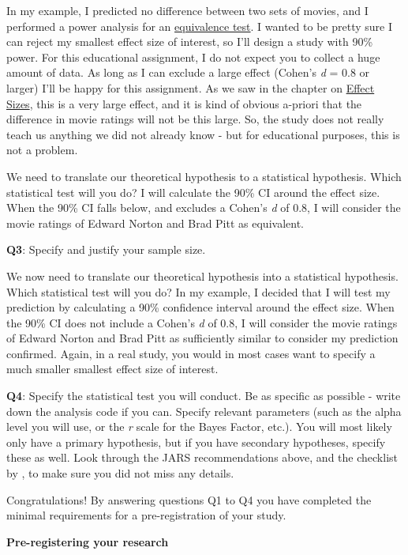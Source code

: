 \documentclass[
  oneside]{book}
\begin{document}
In my example, I predicted no difference between two sets of movies, and I performed a power
analysis for an \protect\hyperlink{equivalencetest}{equivalence test}. I wanted to be pretty sure I can reject my smallest effect size of interest, so I'll design a study with 90\% power. For this educational assignment, I do not expect you to collect a huge amount of data. As long as I can exclude a large effect (Cohen's \emph{d} = 0.8 or larger) I'll be happy for this assignment. As we saw in the chapter on \protect\hyperlink{effectsize}{Effect Sizes}, this is a very large effect, and it is kind of obvious a-priori that the difference in movie ratings will not be this large. So, the study does not really teach us anything we did not already know - but for educational purposes, this is not a problem.

We need to translate our theoretical hypothesis to a statistical hypothesis.
Which statistical test will you do? I will calculate the 90\% CI around the
effect size. When the 90\% CI falls below, and excludes a Cohen's \emph{d} of 0.8, I
will consider the movie ratings of Edward Norton and Brad Pitt as equivalent.

\textbf{Q3}: Specify and justify your sample size.

We now need to translate our theoretical hypothesis into a statistical hypothesis. Which statistical test will you do? In my example, I decided that I will test my prediction by calculating a 90\% confidence interval around the effect size. When the 90\% CI does not include a Cohen's \emph{d} of 0.8, I will consider the movie ratings of Edward Norton and Brad Pitt as sufficiently similar to consider my prediction confirmed. Again, in a real study, you would in most cases want to specify a much smaller smallest effect size of interest.

\textbf{Q4}: Specify the statistical test you will conduct. Be as specific as possible - write down the analysis code if you can. Specify relevant parameters (such as the alpha level you will use, or the \emph{r} scale for the Bayes Factor, etc.). You will most likely only have a primary hypothesis, but if you have secondary hypotheses, specify these as well. Look through the JARS recommendations above, and the checklist by \citet{wicherts_degrees_2016}, to make sure you did not miss any details.

Congratulations! By answering questions Q1 to Q4 you have completed the minimal requirements for a pre-registration of your study.

\textbf{Pre-registering your research}
\end{document}
